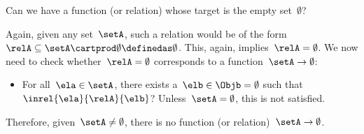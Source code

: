 \begin{exercise}
    Can we have a function (or relation) whose target is the empty set~$\emptyset$?
\end{exercise}
\begin{solution}
    Again, given any set~$\setA$, such a relation would be of the form~$\relA \subseteq \setA \cartprod \emptyset\definedas \emptyset$.
    This, again, implies~$\relA=\emptyset$.
    We now need to check whether~$\relA=\emptyset$ corresponds to a function~$\setA \to \emptyset$:
    \begin{itemize}
        \item For all~$\ela\in \setA$, there exists a~$\elb\in \Objb=\emptyset$ such that~$\inrel{\ela}{\relA}{\elb}$?
              Unless~$\setA=\emptyset$, this is not satisfied.
    \end{itemize}
    Therefore, given~$\setA \neq \emptyset$, there is no function (or relation)~$\setA \to \emptyset$.
\end{solution}
